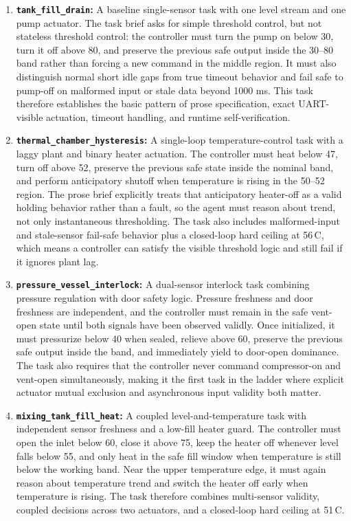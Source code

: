 \documentclass[a4paper,fleqn]{cas-dc}
\DeclareRobustCommand{\tool}[1]{\texttt{\nolinkurl{#1}}}
\begin{document}
\begin{enumerate}
    \item \textbf{\tool{tank_fill_drain}:} A baseline single-sensor task with one level stream and one pump actuator. The task brief asks for simple threshold control, but not stateless threshold control: the controller must turn the pump on below 30, turn it off above 80, and preserve the previous safe output inside the 30--80 band rather than forcing a new command in the middle region. It must also distinguish normal short idle gaps from true timeout behavior and fail safe to pump-off on malformed input or stale data beyond 1000 ms. This task therefore establishes the basic pattern of prose specification, exact UART-visible actuation, timeout handling, and runtime self-verification.

    \item \textbf{\tool{thermal_chamber_hysteresis}:} A single-loop temperature-control task with a laggy plant and binary heater actuation. The controller must heat below 47, turn off above 52, preserve the previous safe state inside the nominal band, and perform anticipatory shutoff when temperature is rising in the 50--52 region. The prose brief explicitly treats that anticipatory heater-off as a valid holding behavior rather than a fault, so the agent must reason about trend, not only instantaneous thresholding. The task also includes malformed-input and stale-sensor fail-safe behavior plus a closed-loop hard ceiling at 56\,\textdegree C, which means a controller can satisfy the visible threshold logic and still fail if it ignores plant lag.

    \item \textbf{\tool{pressure_vessel_interlock}:} A dual-sensor interlock task combining pressure regulation with door safety logic. Pressure freshness and door freshness are independent, and the controller must remain in the safe vent-open state until both signals have been observed validly. Once initialized, it must pressurize below 40 when sealed, relieve above 60, preserve the previous safe output inside the band, and immediately yield to door-open dominance. The task also requires that the controller never command compressor-on and vent-open simultaneously, making it the first task in the ladder where explicit actuator mutual exclusion and asynchronous input validity both matter.

    \item \textbf{\tool{mixing_tank_fill_heat}:} A coupled level-and-temperature task with independent sensor freshness and a low-fill heater guard. The controller must open the inlet below 60, close it above 75, keep the heater off whenever level falls below 55, and only heat in the safe fill window when temperature is still below the working band. Near the upper temperature edge, it must again reason about temperature trend and switch the heater off early when temperature is rising. The task therefore combines multi-sensor validity, coupled decisions across two actuators, and a closed-loop hard ceiling at 51\,\textdegree C.


\end{enumerate}
\end{document}
